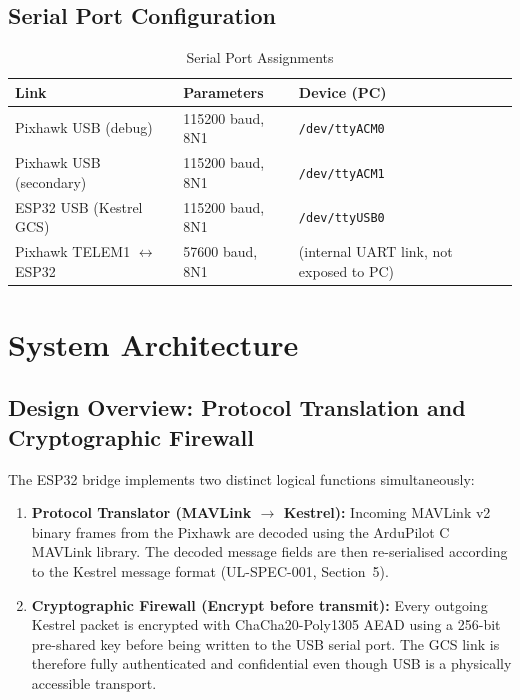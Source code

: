 \documentclass[11pt,a4paper]{article}
\begin{document}
\subsection{Serial Port Configuration}

\begin{table}[H]
    \centering
    \begin{tabular}{@{}lll@{}}
        \toprule
        \textbf{Link}              & \textbf{Parameters}           &
        \textbf{Device (PC)} \\
        \midrule
        Pixhawk USB (debug)        & 115200 baud, 8N1              &
            \texttt{/dev/ttyACM0} \\
        Pixhawk USB (secondary)    & 115200 baud, 8N1              &
            \texttt{/dev/ttyACM1} \\
        ESP32 USB (Kestrel GCS)    & 115200 baud, 8N1              &
            \texttt{/dev/ttyUSB0} \\
        Pixhawk TELEM1 $\leftrightarrow$ ESP32 & 57600 baud, 8N1 &
            (internal UART link, not exposed to PC) \\
        \bottomrule
    \end{tabular}
    \caption{Serial Port Assignments}
\end{table}

\newpage

\section{System Architecture}
\label{sec:architecture}

\subsection{Design Overview: Protocol Translation and Cryptographic Firewall}

The ESP32 bridge implements two distinct logical functions simultaneously:

\begin{enumerate}
    \item \textbf{Protocol Translator (MAVLink $\rightarrow$ Kestrel):}
          Incoming MAVLink v2 binary frames from the Pixhawk are decoded using
          the ArduPilot C MAVLink library. The decoded message fields are then
          re-serialised according to the Kestrel message format
          (UL-SPEC-001, Section~5).
    \item \textbf{Cryptographic Firewall (Encrypt before transmit):}
          Every outgoing Kestrel packet is encrypted with ChaCha20-Poly1305 AEAD
          using a 256-bit pre-shared key before being written to the USB serial
          port. The GCS link is therefore fully authenticated and confidential
          even though USB is a physically accessible transport.
\end{enumerate}
\end{document}
